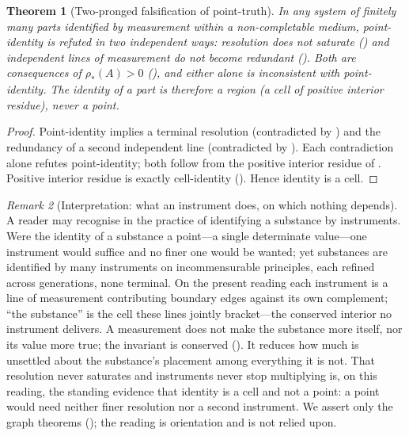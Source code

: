 \documentclass[11pt,a4paper]{article}
\theoremstyle{thmstyle}
\newtheorem{theorem}{Theorem}[section]
\theoremstyle{definition}
\theoremstyle{remark}
\newtheorem{remark}[theorem]{Remark}
\newcommand{\idres}{\rho_{\!*}}            %
\begin{document}
\begin{theorem}[Two-pronged falsification of point-truth]
\label{thm:falsification}
In any system of finitely many parts identified by measurement within a
non-completable medium, point-identity is refuted in two independent ways:
resolution does not saturate \textup{(}\textup{)} and
independent lines of measurement do not become redundant
\textup{(}\textup{)}. Both are consequences of
$\idres(A)>0$ \textup{(}\textup{)}, and either alone is
inconsistent with point-identity. The identity of a part is therefore a region
\textup{(}a cell of positive interior residue\textup{)}, never a point.
\end{theorem}

\begin{proof}
Point-identity implies a terminal resolution (contradicted by
) and the redundancy of a second independent line
(contradicted by ). Each contradiction alone refutes
point-identity; both follow from the positive interior residue of
. Positive interior residue is exactly cell-identity
(). Hence identity is a cell.
\end{proof}

\begin{remark}[Interpretation: what an instrument does, on which nothing depends]
\label{rem:instrument-reading}
A reader may recognise  in the practice of identifying a
substance by instruments. Were the identity of a substance a point---a single
determinate value---one instrument would suffice and no finer one would be wanted;
yet substances are identified by many instruments on incommensurable principles,
each refined across generations, none terminal. On the present reading each
instrument is a line of measurement contributing boundary edges against its own
complement; ``the substance'' is the cell these lines jointly bracket---the
conserved interior no instrument delivers. A measurement does not make the
substance more itself, nor its value more true; the invariant is conserved
(). It reduces how much is unsettled about the
substance's placement among everything it is not. That resolution never saturates
and instruments never stop multiplying is, on this reading, the standing evidence
that identity is a cell and not a point: a point would need neither finer
resolution nor a second instrument. We assert only the graph theorems
(); the reading is
orientation and is not relied upon.
\end{remark}
\end{document}
